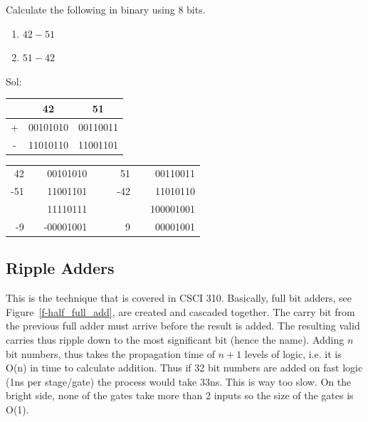 \begin{example}
Calculate the following in binary using 8 bits.
    \begin{enumerate}
    \item $42-51$
    \item $51-42$
    \end{enumerate}

    {\color{ans}Sol:

    \begin{tabular}{|c|c|c|}
      \hline
       & 42 & 51 \\
      \hline
      + & 00101010 & 00110011 \\
      - & 11010110 & 11001101 \\
      \hline
    \end{tabular}

    \begin{tabular}{rrrr|rrrr}
       42 &  & 00101010 & &  &  51 &  & 00110011 \\
      -51 &  & 11001101 & &  & -42 &  & 11010110 \\
      \cline{1-1} \cline{3-3} \cline{6-6} \cline{8-8}
         &  &  11110111 & &  &   &  & 100001001 \\
      -9 &  & -00001001 & &  & 9 &  &  00001001 \\
    \end{tabular}
}
\end{example}

\subsection{Ripple Adders}

This is the technique that is covered in CSCI 310.  Basically, full bit adders, see Figure~\ref{f-half_full_add}, are created and cascaded together.  The carry bit from the previous full adder must arrive before the result is added.  The resulting valid carries thus ripple down to the most significant bit (hence the name).  Adding $n$ bit numbers, thus takes the propagation time of $n+1$ levels of logic, i.e. it is O(n) in time to calculate addition.  Thus if 32 bit numbers are added on fast logic (1ns per stage/gate) the process would take 33ns.  This is way too slow.  On the bright side, none of the gates take more than 2 inputs so the size of the gates is O(1).

